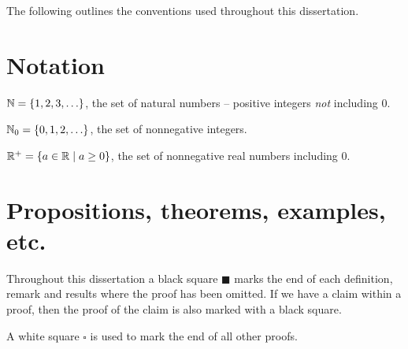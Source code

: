 The following outlines the conventions used throughout this dissertation.

\section*{Notation}
\begin{trivlist}
	\item $\mathbb{N} = \{1, 2, 3, \ldots\}$, the set of natural numbers -- positive integers \emph{not} including $0$.
	\item $\mathbb{N}_0 = \{0, 1, 2, \ldots\}$, the set of nonnegative integers.
	\item $\mathbb{R}^+ = \{a \in \mathbb{R} \mid a \geq 0\}$, the set of nonnegative real numbers including $0$.
\end{trivlist}

\section*{Propositions, theorems, examples, etc.}
Throughout this dissertation a black square $\blacksquare$ marks the end of each definition, remark and results where the proof has been omitted. If we have a claim within a proof, then the proof of the claim is also marked with a black square.

A white square $\square$ is used to mark the end of all other proofs.
